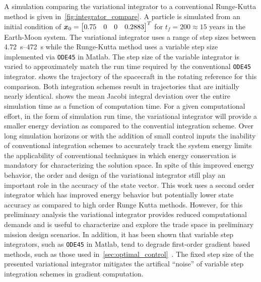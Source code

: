 \documentclass[smallcondensed]{svjour3}
\begin{document}
A simulation comparing the variational integrator to a conventional Runge-Kutta method is given in~\cref{fig:integrator_compare}.
A particle is simulated from an initial condition of \( \bm{x}_0 = \begin{bmatrix} 0.75 & 0 & 0 & 0.2883\end{bmatrix}^T \) for \( t_f = 200 \approx 15\) years in the Earth-Moon system.
    The variational integrator uses a range of step sizes between \SIrange{4.72}{472}{\second} while the Runge-Kutta method uses a variable step size implemented via \texttt{ODE45} in Matlab.
    The step size of the variable integrator is varied to approximately match the run time required by the conventional \texttt{ODE45} integrator.
 shows the trajectory of the spacecraft in the rotating reference for this comparison.
Both integration schemes result in trajectories that are initially nearly identical.
 shows the mean Jacobi integral deviation over the entire simulation time as a function of computation time.
For a given computational effort, in the form of simulation run time, the variational integrator will provide a smaller energy deviation as compared to the convential integration scheme.
Over long simulation horizons or with the addition of small control inputs the inability of conventional integration schemes to accurately track the system energy limits the applicability of conventional techniques in which energy conservation is mandatory for characterizing the solution space.
In spite of this improved energy behavior, the order and design of the variational integrator still play an important role in the accuracy of the state vector.
This work uses a second order integrator which has improved energy behavior but potentially lower state accuracy as compared to high order Runge Kutta methods. 
However, for this preliminary analysis the variational integrator provides reduced computational demands and is useful to characterize and explore the trade space in preliminary mission design scenarios.
In addition, it has been shown that variable step integrators, such as \texttt{ODE45} in Matlab, tend to degrade first-order gradient based methods, such as those used in~\cref{sec:optimal_control}~\cite{pellegrini2016}.
The fixed step size of the presented variational integrator mitigates the artifical ``noise'' of variable step integration schemes in gradient computation.
\end{document}
